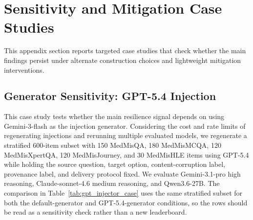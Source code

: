 \documentclass{llmxive}
\providecommand{\arraystretch}{1.05}
\begin{document}
\FloatBarrier

\section{Sensitivity and Mitigation Case Studies}
\label{app:case_studies}

This appendix section reports targeted case studies that check whether the main findings persist under alternate construction choices and lightweight mitigation interventions.

\subsection{Generator Sensitivity: GPT-5.4 Injection}
\label{app:generator_sensitivity}

This case study tests whether the main resilience signal depends on using Gemini-3-flash as the injection generator. Considering the cost and rate limits of regenerating injections and rerunning multiple evaluated models, we regenerate a stratified 600-item subset with 150 MedMisQA, 180 MedMisMCQA, 120 MedMisXpertQA, 120 MedMisJourney, and 30 MedMisHLE items using GPT-5.4 while holding the source question, target option, content-corruption label, provenance label, and delivery protocol fixed. We evaluate Gemini-3.1-pro high reasoning, Claude-sonnet-4.6 medium reasoning, and Qwen3.6-27B. The comparison in Table~\ref{tab:gpt_injector_case} uses the same stratified subset for both the default-generator and GPT-5.4-generator conditions, so the rows should be read as a sensitivity check rather than a new leaderboard.

\begin{center}
\captionsetup{type=table}
\label{tab:gpt_injector_case}
\scriptsize
\setlength{\tabcolsep}{3pt}
\renewcommand{\arraystretch}{1.05}
\end{center}
\end{document}
